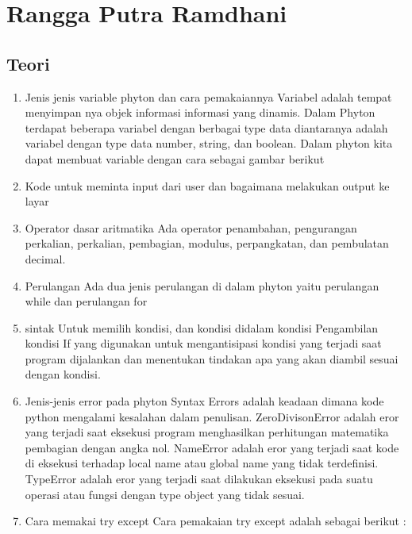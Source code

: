 \section{Rangga Putra Ramdhani}
\subsection{Teori}
\begin{enumerate}
    \item Jenis jenis variable phyton dan cara pemakaiannya
Variabel adalah tempat menyimpan nya objek informasi informasi yang dinamis. Dalam Phyton terdapat beberapa variabel dengan berbagai type data diantaranya adalah variabel dengan type data number, string, dan boolean. Dalam phyton kita dapat membuat variable dengan cara sebagai gambar berikut
   
    \item Kode untuk meminta input dari user dan bagaimana melakukan output ke layar
 
    \item Operator dasar aritmatika
Ada operator penambahan, pengurangan perkalian, perkalian, pembagian, modulus, perpangkatan, dan pembulatan decimal.

    \item Perulangan
Ada dua jenis perulangan di dalam phyton yaitu perulangan while dan perulangan for
 
 
    \item sintak Untuk memilih kondisi, dan kondisi didalam kondisi
Pengambilan kondisi If yang digunakan untuk mengantisipasi kondisi yang terjadi saat program dijalankan dan menentukan tindakan apa yang akan diambil sesuai dengan kondisi.
  
  
  

    \item Jenis-jenis error pada phyton
Syntax Errors adalah keadaan dimana kode python mengalami kesalahan dalam penulisan. 
ZeroDivisonError adalah eror yang terjadi saat eksekusi program menghasilkan perhitungan matematika pembagian dengan angka nol.
NameError adalah eror yang terjadi saat kode di eksekusi terhadap local name atau global name yang tidak terdefinisi. 
TypeError adalah eror yang terjadi saat dilakukan eksekusi pada suatu operasi atau fungsi dengan type object yang tidak sesuai.

    \item Cara memakai try except
Cara pemakaian try except adalah sebagai berikut :


\end{enumerate}

